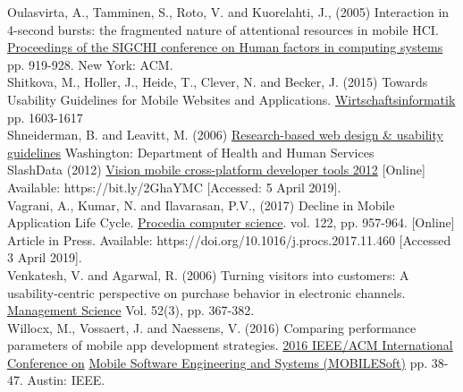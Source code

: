 \documentclass[version=last,fontsize=13pt]{scrartcl}
\begin{document}
Oulasvirta, A., Tamminen, S., Roto, V. and Kuorelahti, J., (2005) Interaction in 4-second bursts: the fragmented nature of attentional resources in mobile HCI. \\

\underline{ Proceedings of the SIGCHI conference on Human factors in computing systems} pp. 919-928. New York: ACM. \\

Shitkova, M., Holler, J., Heide, T., Clever, N. and Becker, J. (2015)  Towards Usability Guidelines for Mobile Websites and Applications.  \underline{Wirtschaftsinformatik} pp. 1603-1617 \\

Shneiderman, B. and Leavitt, M. (2006) \underline{Research-based web design \& usability}\\ \underline{guidelines} Washington: Department of Health and Human Services\\

SlashData (2012) \underline{Vision mobile cross-platform developer tools 2012}  [Online] Available: https://bit.ly/2GhaYMC [Accessed: 5 April 2019].\\

Vagrani, A., Kumar, N. and Ilavarasan, P.V., (2017) Decline in Mobile Application Life Cycle. \underline{Procedia computer science}. vol. 122, pp. 957-964. [Online] Article in Press. Available: https://doi.org/10.1016/j.procs.2017.11.460 [Accessed 3 April 2019].\\

Venkatesh, V. and Agarwal, R. (2006) Turning visitors into customers: A usability-centric perspective on purchase behavior in electronic channels. \underline{Management Science} Vol. 52(3),  pp. 367-382.\\

Willocx, M., Vossaert, J. and Naessens, V. (2016) Comparing performance parameters of mobile app development strategies.  \underline{2016 IEEE/ACM International Conference on} \underline{Mobile Software Engineering and Systems (MOBILESoft)} pp. 38-47.  Austin: IEEE.\\
\end{document}
